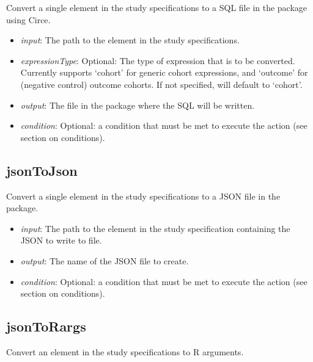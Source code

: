 \documentclass[]{article}
\providecommand{\tightlist}{%
  \setlength{\itemsep}{0pt}\setlength{\parskip}{0pt}}
\begin{document}
Convert a single element in the study specifications to a SQL file in
the package using Circe.

\begin{itemize}
\tightlist
\item
  \emph{input}: The path to the element in the study specifications.
\item
  \emph{expressionType}: Optional: The type of expression that is to be
  converted. Currently supports `cohort' for generic cohort expressions,
  and `outcome' for (negative control) outcome cohorts. If not
  specified, will default to `cohort'.
\item
  \emph{output}: The file in the package where the SQL will be written.
\item
  \emph{condition}: Optional: a condition that must be met to execute
  the action (see section on conditions).
\end{itemize}

\hypertarget{jsontojson}{%
\subsection{jsonToJson}\label{jsontojson}}

Convert a single element in the study specifications to a JSON file in
the package.

\begin{itemize}
\tightlist
\item
  \emph{input}: The path to the element in the study specification
  containing the JSON to write to file.
\item
  \emph{output}: The name of the JSON file to create.
\item
  \emph{condition}: Optional: a condition that must be met to execute
  the action (see section on conditions).
\end{itemize}

\hypertarget{jsontorargs}{%
\subsection{jsonToRargs}\label{jsontorargs}}

Convert an element in the study specifications to R arguments.
\end{document}
